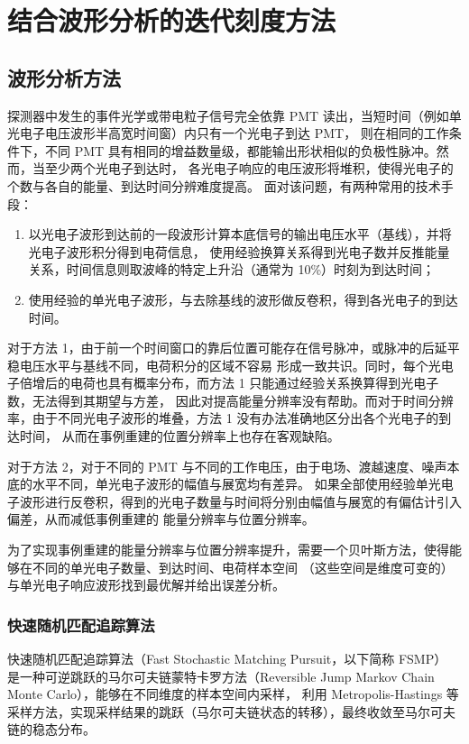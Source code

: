 
\chapter{结合波形分析的迭代刻度方法}

\section{波形分析方法}
探测器中发生的事件光学或带电粒子信号完全依靠 PMT 读出，当短时间（例如单光电子电压波形半高宽时间窗）内只有一个光电子到达 PMT，
则在相同的工作条件下，不同 PMT 具有相同的增益数量级，都能输出形状相似的负极性脉冲。然而，当至少两个光电子到达时，
各光电子响应的电压波形将堆积，使得光电子的个数与各自的能量、到达时间分辨难度提高。
面对该问题，有两种常用的技术手段：
\begin{enumerate}
    \item 以光电子波形到达前的一段波形计算本底信号的输出电压水平（基线），并将光电子波形积分得到电荷信息，
    使用经验换算关系得到光电子数并反推能量关系，时间信息则取波峰的特定上升沿（通常为 10\%）时刻为到达时间；
    \item 使用经验的单光电子波形，与去除基线的波形做反卷积，得到各光电子的到达时间。
\end{enumerate}

对于方法 1，由于前一个时间窗口的靠后位置可能存在信号脉冲，或脉冲的后延平稳电压水平与基线不同，电荷积分的区域不容易
形成一致共识。同时，每个光电子倍增后的电荷也具有概率分布，而方法 1 只能通过经验关系换算得到光电子数，无法得到其期望与方差，
因此对提高能量分辨率没有帮助。而对于时间分辨率，由于不同光电子波形的堆叠，方法 1 没有办法准确地区分出各个光电子的到达时间，
从而在事例重建的位置分辨率上也存在客观缺陷。

对于方法 2，对于不同的 PMT 与不同的工作电压，由于电场、渡越速度、噪声本底的水平不同，单光电子波形的幅值与展宽均有差异。
如果全部使用经验单光电子波形进行反卷积，得到的光电子数量与时间将分别由幅值与展宽的有偏估计引入偏差，从而减低事例重建的
能量分辨率与位置分辨率。

为了实现事例重建的能量分辨率与位置分辨率提升，需要一个贝叶斯方法，使得能够在不同的单光电子数量、到达时间、电荷样本空间
（这些空间是维度可变的）与单光电子响应波形找到最优解并给出误差分析。
\subsection{快速随机匹配追踪算法}\label{sec:fsmp}
快速随机匹配追踪算法（Fast Stochastic Matching Pursuit，以下简称 FSMP）\cite{wangFastStochasticMatching2024a}
是一种可逆跳跃的马尔可夫链蒙特卡罗方法（Reversible Jump Markov Chain Monte Carlo），能够在不同维度的样本空间内采样，
利用 Metropolis-Hastings 等采样方法，实现采样结果的跳跃（马尔可夫链状态的转移），最终收敛至马尔可夫链的稳态分布。

